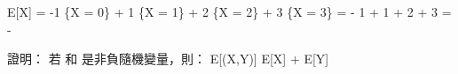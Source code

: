 \startformula\startmathalignment
\NC E[X] \NC = -1 \cdot \Pr\{X = 0\} +
             1 \cdot \Pr\{X = 1\} +
             2 \cdot \Pr\{X = 2\} +
             3 \cdot \Pr\{X = 3\} \NR
\NC \NC = - 1 \cdot {}
            + 1 \cdot {}
            + 2 \cdot {}
            + 3 \cdot {} \NR
\NC \NC = -  \NR
\NC \NC {} \NR
\stopmathalignment\stopformula
\stopANSWER

\startEXERCISE
證明：
若  和  是非負隨機變量，則：
\startformula
E[\max(X,Y)] \le E[X] + E[Y]
\stopformula
\stopEXERCISE

\startANSWER
{}
\stopANSWER

\stopsection
